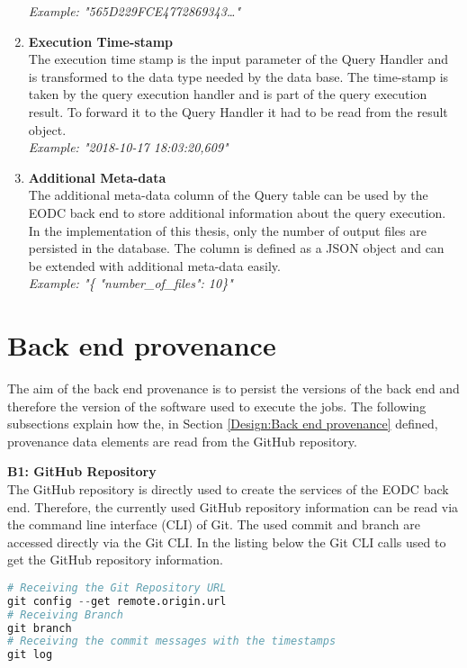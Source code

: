 \documentclass[draft,final]{vutinfth} %
\begin{document}
\begin{enumerate}
	\textit{Example: "565D229FCE4772869343\dots"} 
	\item \textbf{Execution Time-stamp} \\
	The execution time stamp is the input parameter of the Query Handler and is transformed to the data type needed by the data base. The time-stamp is taken by the query execution handler and is part of the query execution result. To forward it to the Query Handler it had to be read from the result object. \\
	\textit{Example: "2018-10-17 18:03:20,609"}  
	\item \textbf{Additional Meta-data} \\
	The additional meta-data column of the Query table can be used by the EODC back end to store additional information about the query execution. In the implementation of this thesis, only the number of output files are persisted in the database. The column is defined as a JSON object and can be extended with additional meta-data easily. \\
	\textit{Example: "\{ "number\_of\_files": 10\}"}    	 
\end{enumerate}

\section{Back end provenance}\label{Implementation:Back end provenance}

The aim of the back end provenance is to persist the versions of the back end and therefore the version of the software used to execute the jobs. The following subsections explain how the, in Section \ref{Design:Back end provenance} defined, provenance data elements are read from the GitHub repository.  

\textbf{B1: GitHub Repository} \\
The GitHub repository is directly used to create the services of the EODC back end. Therefore, the currently used GitHub repository information can be read via the command line interface (CLI) of Git. The used commit and branch are accessed directly via the Git CLI. In the listing below the Git CLI calls used to get the GitHub repository information.       

\begin{lstlisting}[frame=single, language=Python]
# Receiving the Git Repository URL
git config --get remote.origin.url 
# Receiving Branch
git branch
# Receiving the commit messages with the timestamps
git log 
\end{lstlisting}
\end{document}
